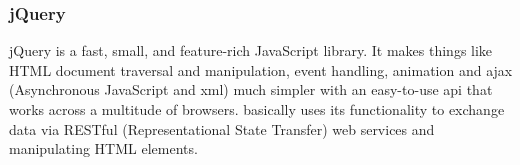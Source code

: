 \subsubsection{jQuery}
jQuery is a fast, small, and feature-rich JavaScript library. It makes things like HTML document traversal and manipulation, event handling, animation and ajax (Asynchronous JavaScript and \gls{xml}) much simpler with an easy-to-use \gls{api} that works across a multitude of browsers. \toolname{} basically uses its functionality to exchange data via RESTful (Representational State Transfer) web services and manipulating HTML elements.